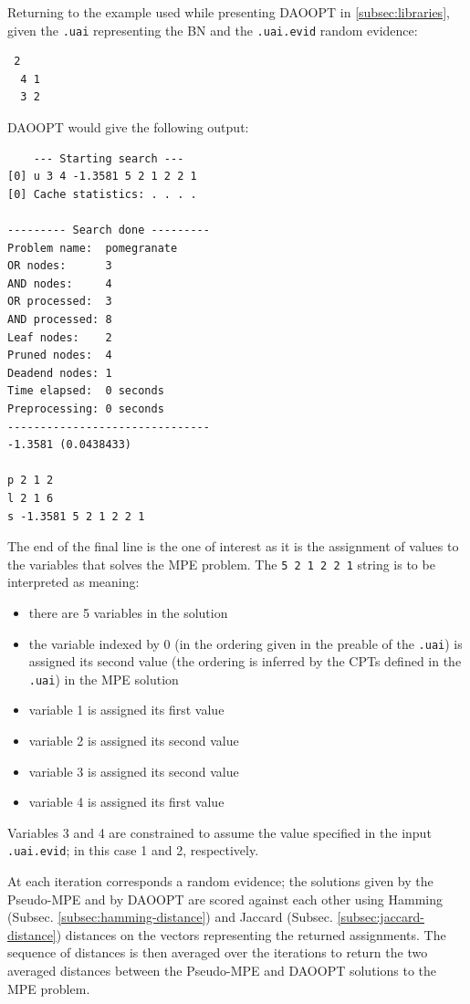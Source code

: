 Returning to the example used while presenting DAOOPT in \ref{subsec:libraries}, given the \texttt{.uai} representing the BN and the \texttt{.uai.evid} random evidence:
\begin{verbatim}
 2
  4 1
  3 2
\end{verbatim}
DAOOPT would give the following output:
\begin{verbatim}
	--- Starting search ---
[0] u 3 4 -1.3581 5 2 1 2 2 1
[0] Cache statistics: . . . .

--------- Search done ---------
Problem name:  pomegranate
OR nodes:      3
AND nodes:     4
OR processed:  3
AND processed: 8
Leaf nodes:    2
Pruned nodes:  4
Deadend nodes: 1
Time elapsed:  0 seconds
Preprocessing: 0 seconds
-------------------------------
-1.3581 (0.0438433)

p 2 1 2
l 2 1 6
s -1.3581 5 2 1 2 2 1
\end{verbatim}
The end of the final line is the one of interest as it is the assignment of values to the variables that solves the MPE problem.
The \texttt{5 2 1 2 2 1} string is to be interpreted as meaning:
\begin{itemize}
  \item there are 5 variables in the solution
  \item the variable indexed by 0 (in the ordering given in the preable of the \texttt{.uai}) is assigned its second value (the ordering is inferred by the CPTs defined in the \texttt{.uai}) in the MPE solution
  \item variable 1 is assigned its first value
  \item variable 2 is assigned its second value
  \item variable 3 is assigned its second value
  \item variable 4 is assigned its first value
\end{itemize}
Variables 3 and 4 are constrained to assume the value specified in the input \texttt{.uai.evid}; in this case 1 and 2, respectively.

At each iteration corresponds a random evidence; the solutions given by the Pseudo-MPE and by DAOOPT are scored against each other using Hamming (Subsec. \ref{subsec:hamming-distance}) and Jaccard (Subsec. \ref{subsec:jaccard-distance}) distances on the vectors representing the returned assignments.
The sequence of distances is then averaged over the iterations to return the two averaged distances between the Pseudo-MPE and DAOOPT solutions to the MPE problem.

